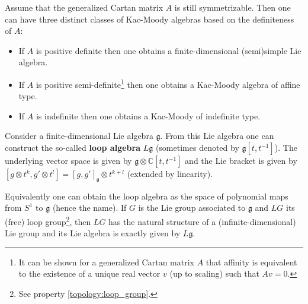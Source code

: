         \begin{remark}
        	Assume that the generalized Cartan matrix $A$ is still symmetrizable. Then one can have three distinct classes of Kac-Moody algebras based on the definiteness of $A$:
        	\begin{itemize}
        		\item If $A$ is positive definite then one obtains a finite-dimensional (semi)simple Lie algebra.
        		\item If $A$ is positive semi-definite\footnote{It can be shown for a generalized Cartan matrix $A$ that affinity is equivalent to the existence of a unique real vector $v$ (up to scaling) such that $Av=0$.} then one obtains a Kac-Moody algebra of affine type.
        		\item If $A$ is indefinite then one obtains a Kac-Moody of indefinite type.
        	\end{itemize}
        \end{remark}
        
        \begin{construct}
		Consider a finite-dimensional Lie algebra $\mathfrak{g}$. From this Lie algebra one can construct the so-called \textbf{loop algebra} $L\mathfrak{g}$ (sometimes denoted by $\mathfrak{g}[t, t^{-1}]$). The underlying vector space is given by $\mathfrak{g}\otimes\mathbb{C}[t, t^{-1}]$ and the Lie bracket is given by $[g\otimes t^k, g'\otimes t^l] = [g, g']_{\mathfrak{g}}\otimes t^{k+l}$ (extended by linearity).
		
		Equivalently one can obtain the loop algebra as the space of polynomial maps from $S^1$ to $\mathfrak{g}$ (hence the name). If $G$ is the Lie group associated to $\mathfrak{g}$ and $LG$ its (free) loop group\footnote{See property \ref{topology:loop_group}.}, then $LG$ has the natural structure of a (infinite-dimensional) Lie group and its Lie algebra is exactly given by $L\mathfrak{g}$.
        \end{construct}
        
